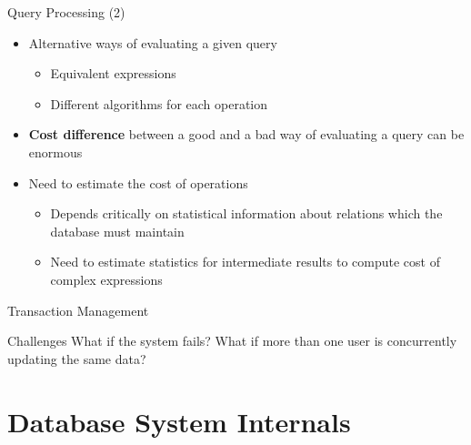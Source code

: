 \documentclass[aspectratio=169, xcolor=dvipsnames]{beamer}
\begin{document}
\begin{frame}{Query Processing (2)}
    \begin{itemize}[<+->]
        \item Alternative ways of evaluating a given query
        \begin{itemize}
            \item Equivalent expressions
            \item Different algorithms for each operation
        \end{itemize}
        \item \textbf{Cost difference} between a good and a bad way of evaluating a query can be enormous
        \item Need to estimate the cost of operations
        \begin{itemize}
            \item Depends critically on statistical information about relations which the database must maintain
            \item Need to estimate statistics for intermediate results to compute cost of complex expressions
        \end{itemize}
    \end{itemize}
\end{frame}

\begin{frame}{Transaction Management}
    \begin{alertblock}{Challenges}
        What if the system fails? What if more than one user is concurrently updating the same data?
    \end{alertblock}
    
\end{frame}

\section{Database System Internals}
\end{document}
